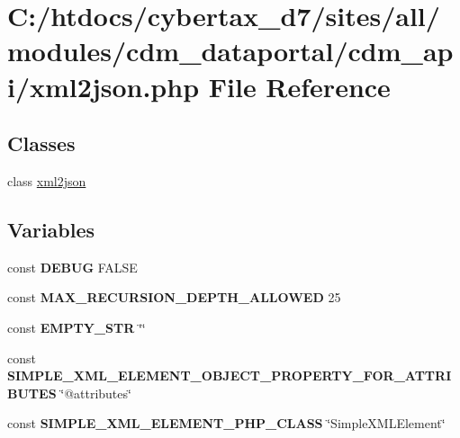 \hypertarget{xml2json_8php}{\section{C\-:/htdocs/cybertax\-\_\-d7/sites/all/modules/cdm\-\_\-dataportal/cdm\-\_\-api/xml2json.php File Reference}
\label{xml2json_8php}
}
\subsection*{Classes}
\begin{DoxyCompactItemize}
\item 
class \hyperlink{classxml2json}{xml2json}
\end{DoxyCompactItemize}
\subsection*{Variables}
\begin{DoxyCompactItemize}
\item 
\hypertarget{xml2json_8php_a758c150b67e476ecf77478f16b387c61}{const {\bfseries D\-E\-B\-U\-G} F\-A\-L\-S\-E}\label{xml2json_8php_a758c150b67e476ecf77478f16b387c61}

\item 
\hypertarget{xml2json_8php_ab119b4a0e7c1fce716a6efc0fb725576}{const {\bfseries M\-A\-X\-\_\-\-R\-E\-C\-U\-R\-S\-I\-O\-N\-\_\-\-D\-E\-P\-T\-H\-\_\-\-A\-L\-L\-O\-W\-E\-D} 25}\label{xml2json_8php_ab119b4a0e7c1fce716a6efc0fb725576}

\item 
\hypertarget{xml2json_8php_aaae6ad8e1feef3c4b741528608c63616}{const {\bfseries E\-M\-P\-T\-Y\-\_\-\-S\-T\-R} \char`\"{}\char`\"{}}\label{xml2json_8php_aaae6ad8e1feef3c4b741528608c63616}

\item 
\hypertarget{xml2json_8php_a297d68e2fe780a91caae7842ee821f4b}{const {\bfseries S\-I\-M\-P\-L\-E\-\_\-\-X\-M\-L\-\_\-\-E\-L\-E\-M\-E\-N\-T\-\_\-\-O\-B\-J\-E\-C\-T\-\_\-\-P\-R\-O\-P\-E\-R\-T\-Y\-\_\-\-F\-O\-R\-\_\-\-A\-T\-T\-R\-I\-B\-U\-T\-E\-S} \char`\"{}@attributes\char`\"{}}\label{xml2json_8php_a297d68e2fe780a91caae7842ee821f4b}

\item 
\hypertarget{xml2json_8php_af5af869aea583dc08140a4dd3869d5a0}{const {\bfseries S\-I\-M\-P\-L\-E\-\_\-\-X\-M\-L\-\_\-\-E\-L\-E\-M\-E\-N\-T\-\_\-\-P\-H\-P\-\_\-\-C\-L\-A\-S\-S} \char`\"{}Simple\-X\-M\-L\-Element\char`\"{}}\label{xml2json_8php_af5af869aea583dc08140a4dd3869d5a0}

\end{DoxyCompactItemize}


